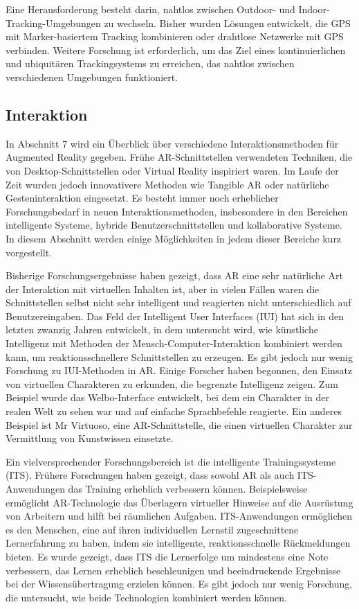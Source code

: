 Eine Herausforderung besteht darin, nahtlos zwischen Outdoor- und
Indoor-Tracking-Umgebungen zu wechseln. Bisher wurden Lösungen entwickelt, die
GPS mit Marker-basiertem Tracking kombinieren oder drahtlose Netzwerke mit GPS
verbinden. Weitere Forschung ist erforderlich, um das Ziel eines
kontinuierlichen und ubiquitären Trackingsystems zu erreichen, das nahtlos
zwischen verschiedenen Umgebungen funktioniert.
\subsection{Interaktion}

In Abschnitt 7 wird ein Überblick über verschiedene Interaktionsmethoden für
Augmented Reality gegeben. Frühe AR-Schnittstellen verwendeten Techniken, die
von Desktop-Schnittstellen oder Virtual Reality inspiriert waren. Im Laufe der
Zeit wurden jedoch innovativere Methoden wie Tangible AR oder natürliche
Gesteninteraktion eingesetzt. Es besteht immer noch erheblicher
Forschungsbedarf in neuen Interaktionsmethoden, insbesondere in den Bereichen
intelligente Systeme, hybride Benutzerschnittstellen und kollaborative Systeme.
In diesem Abschnitt werden einige Möglichkeiten in jedem dieser Bereiche kurz
vorgestellt.

Bisherige Forschungsergebnisse haben gezeigt, dass AR eine sehr natürliche Art
der Interaktion mit virtuellen Inhalten ist, aber in vielen Fällen waren die
Schnittstellen selbst nicht sehr intelligent und reagierten nicht
unterschiedlich auf Benutzereingaben. Das Feld der Intelligent User Interfaces
(IUI) hat sich in den letzten zwanzig Jahren entwickelt, in dem untersucht
wird, wie künstliche Intelligenz mit Methoden der Mensch-Computer-Interaktion
kombiniert werden kann, um reaktionsschnellere Schnittstellen zu erzeugen. Es
gibt jedoch nur wenig Forschung zu IUI-Methoden in AR. Einige Forscher haben
begonnen, den Einsatz von virtuellen Charakteren zu erkunden, die begrenzte
Intelligenz zeigen. Zum Beispiel wurde das Welbo-Interface entwickelt, bei dem
ein Charakter in der realen Welt zu sehen war und auf einfache Sprachbefehle
reagierte. Ein anderes Beispiel ist Mr Virtuoso, eine AR-Schnittstelle, die
einen virtuellen Charakter zur Vermittlung von Kunstwissen einsetzte.

Ein vielversprechender Forschungsbereich ist die intelligente Trainingssysteme
(ITS). Frühere Forschungen haben gezeigt, dass sowohl AR als auch
ITS-Anwendungen das Training erheblich verbessern können. Beispielsweise
ermöglicht AR-Technologie das Überlagern virtueller Hinweise auf die Ausrüstung
von Arbeitern und hilft bei räumlichen Aufgaben. ITS-Anwendungen ermöglichen es
den Menschen, eine auf ihren individuellen Lernstil zugeschnittene
Lernerfahrung zu haben, indem sie intelligente, reaktionsschnelle Rückmeldungen
bieten. Es wurde gezeigt, dass ITS die Lernerfolge um mindestens eine Note
verbessern, das Lernen erheblich beschleunigen und beeindruckende Ergebnisse
bei der Wissensübertragung erzielen können. Es gibt jedoch nur wenig Forschung,
die untersucht, wie beide Technologien kombiniert werden können.

